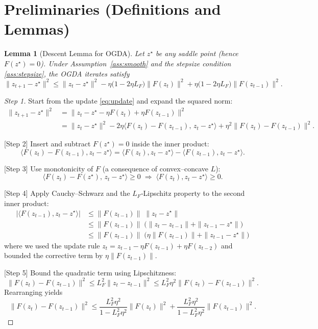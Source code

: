 \documentclass{article}
\newtheorem{lemma}{Lemma}
\begin{document}
\section*{Preliminaries (Definitions and Lemmas)}
\begin{lemma}[Descent Lemma for OGDA]\label{lem:descent}
Let $z^{\star}$ be any saddle point (hence $F(z^{\star})=0$). Under Assumption~\ref{ass:smooth} and the stepsize condition \ref{ass:stepsize}, the OGDA iterates satisfy
\[
\|z_{t+1}-z^{\star}\|^{2}
\le
\|z_{t}-z^{\star}\|^{2}
- \eta\bigl(1-2\eta L_{F}\bigr)\|F(z_{t})\|^{2}
+\eta\bigl(1-2\eta L_{F}\bigr)\|F(z_{t-1})\|^{2}.
\tag{L1}
\]
\end{lemma}
\begin{proof}
[Step 1] Start from the update \eqref{eq:update} and expand the squared norm:
\[
\begin{aligned}
\|z_{t+1}-z^{\star}\|^{2}
&=\bigl\|z_{t}-z^{\star}-\eta F(z_{t})+\eta F(z_{t-1})\bigr\|^{2}\\
&=\|z_{t}-z^{\star}\|^{2}
-2\eta\langle F(z_{t})-F(z_{t-1}),\,z_{t}-z^{\star}\rangle
+\eta^{2}\|F(z_{t})-F(z_{t-1})\|^{2}.
\end{aligned}
\tag{Step 1}
\]

[Step 2] Insert and subtract $F(z^{\star})=0$ inside the inner product:
\[
\langle F(z_{t})-F(z_{t-1}),z_{t}-z^{\star}\rangle
=
\langle F(z_{t}),z_{t}-z^{\star}\rangle
-
\langle F(z_{t-1}),z_{t}-z^{\star}\rangle .
\tag{Step 2}
\]

[Step 3] Use monotonicity of $F$ (a consequence of convex–concave $L$):
\[
\langle F(z_{t})-F(z^{\star}),\,z_{t}-z^{\star}\rangle\ge0
\;\Longrightarrow\;
\langle F(z_{t}),z_{t}-z^{\star}\rangle\ge0.
\tag{Step 3}
\]

[Step 4] Apply Cauchy–Schwarz and the $L_{F}$‑Lipschitz property to the second inner product:
\[
\begin{aligned}
|\langle F(z_{t-1}),z_{t}-z^{\star}\rangle|
&\le \|F(z_{t-1})\|\;\|z_{t}-z^{\star}\|\\
&\le \|F(z_{t-1})\|\;\bigl(\|z_{t}-z_{t-1}\|+\|z_{t-1}-z^{\star}\|\bigr)\\
&\le \|F(z_{t-1})\|\;\bigl(\eta\|F(z_{t-1})\|+\|z_{t-1}-z^{\star}\|\bigr)
\end{aligned}
\tag{Step 4}
\]
where we used the update rule $z_{t}=z_{t-1}-\eta F(z_{t-1})+\eta F(z_{t-2})$ and bounded the corrective term by $\eta\|F(z_{t-1})\|$.

[Step 5] Bound the quadratic term using Lipschitzness:
\[
\|F(z_{t})-F(z_{t-1})\|^{2}\le L_{F}^{2}\|z_{t}-z_{t-1}\|^{2}
\le L_{F}^{2}\eta^{2}\|F(z_{t})-F(z_{t-1})\|^{2}.
\tag{Step 5}
\]
Rearranging yields
\[
\|F(z_{t})-F(z_{t-1})\|^{2}\le\frac{L_{F}^{2}\eta^{2}}{1-L_{F}^{2}\eta^{2}}\|F(z_{t})\|^{2}
+\frac{L_{F}^{2}\eta^{2}}{1-L_{F}^{2}\eta^{2}}\|F(z_{t-1})\|^{2}.
\tag{Step 6}
\]


\end{proof}
\end{document}
